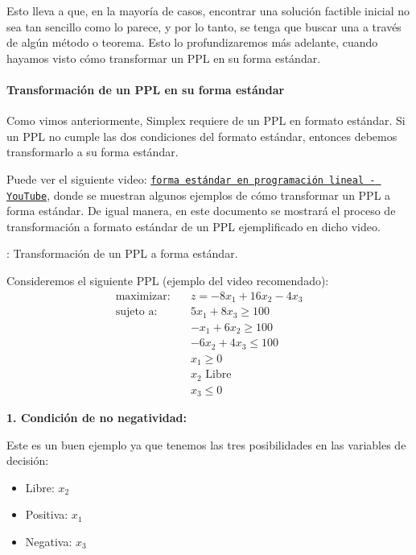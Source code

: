 Esto lleva a que, en la mayoría de casos, encontrar una solución factible inicial no sea tan sencillo como lo parece, y por lo tanto, se tenga que buscar una a través de algún método o teorema. Esto lo profundizaremos más adelante, cuando hayamos visto cómo transformar un PPL en su forma estándar.

\paragraph{Transformación de un PPL en su forma estándar}

Como vimos anteriormente, Simplex requiere de un PPL en formato estándar. Si un PPL no cumple las dos condiciones del formato estándar, entonces debemos transformarlo a su forma estándar. 

Puede ver el siguiente video: \href{https://www.youtube.com/watch?v=6f5K3O7yUzU}{\texttt{forma estándar en programación lineal - YouTube}}, donde se muestran algunos ejemplos de cómo transformar un PPL a forma estándar. De igual manera, en este documento se mostrará el proceso de transformación a formato estándar de un PPL ejemplificado en dicho video. 

\ejemplo\label{ej:transformacion_ppl_forma_estandar}: Transformación de un PPL a forma estándar.

Consideremos el siguiente PPL (ejemplo del video recomendado):
\begin{align*}
  \text{maximizar:} \quad   &z = -8x_1 + 16x_2 - 4x_3 \\[3pt]
  \text{sujeto a:} \quad    &5x_1 + 8x_3 \geq 100 \\
                            &-x_1 + 6x_2 \geq 100 \\
                            &-6x_2 + 4x_3 \leq 100 \\
                            &x_1 \geq 0 \\
                            &x_2 \text{ Libre} \\
                            &x_3 \leq0
\end{align*}

\noindent\textbf{1. Condición de no negatividad:}

Este es un buen ejemplo ya que tenemos las tres posibilidades en las variables de decisión:
\begin{itemize}
  \item Libre: \(x_2\)
  \item Positiva: \(x_1\)
  \item Negativa: \(x_3\)
\end{itemize}


